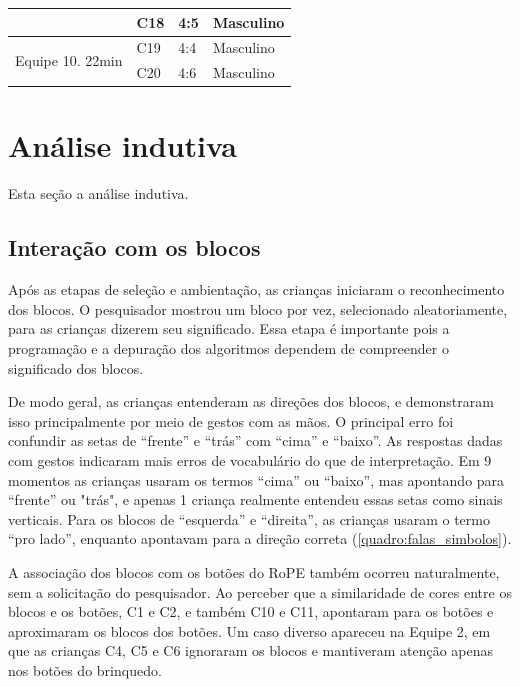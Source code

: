 \begin{quadro}[!h]
{\begin{footnotesize}
{\begin{tabular}{|l|l|l|l|}
                                                                                        & C18              & 4:5                            & Masculino \\ 
            \hline
            \multirow{2}{*}{Equipe 10. 22min}               & C19              & 4:4                            & Masculino \\ 
            \cline{2-4}
                                                                                        & C20              & 4:6                            & Masculino  \\
            \hline
            \end{tabular}
        }
        \end{footnotesize}
    }
\end{quadro}

\section{Análise indutiva}

Esta seção a análise indutiva. 

\subsection{Interação com os blocos}

Após as etapas de seleção e ambientação, as crianças iniciaram o reconhecimento dos blocos. O pesquisador mostrou um bloco por vez, selecionado aleatoriamente, para as crianças dizerem seu significado. Essa etapa é importante pois a programação e a depuração dos algoritmos dependem de compreender o significado dos blocos. 

De modo geral, as crianças entenderam as direções dos blocos, e demonstraram isso principalmente por meio de gestos com as mãos. O principal erro foi confundir as setas de “frente” e “trás” com “cima” e “baixo”. As respostas dadas com gestos indicaram mais erros de vocabulário do que de interpretação. Em 9 momentos as crianças usaram os termos “cima” ou “baixo”, mas apontando para “frente” ou "trás", e apenas 1 criança realmente entendeu essas setas como sinais verticais. Para os blocos de “esquerda” e “direita”, as crianças usaram o termo “pro lado”, enquanto apontavam para a direção correta (\autoref{quadro:falas_simbolos}).

A associação dos blocos com os botões do RoPE também ocorreu naturalmente, sem a solicitação do pesquisador. Ao perceber que a similaridade de cores entre os blocos e os botões, C1 e C2, e também C10 e C11, apontaram para os botões e aproximaram os blocos dos botões. Um caso diverso apareceu na Equipe 2, em que as crianças C4, C5 e C6 ignoraram os blocos e mantiveram atenção apenas nos botões do brinquedo.

